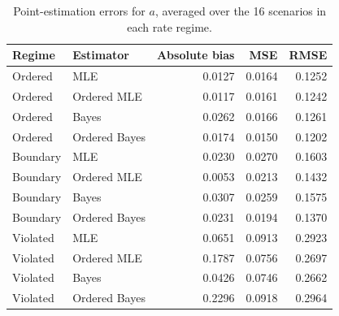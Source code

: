 \begin{table}[htbp]
\centering
\caption{Point-estimation errors for $a$, averaged over the 16 scenarios in each rate regime.}\label{tab:strength_rate}
\small
\begin{tabular}{llrrr}
\toprule
Regime & Estimator & Absolute bias & MSE & RMSE \\
\midrule
Ordered & MLE & 0.0127 & 0.0164 & 0.1252 \\
Ordered & Ordered MLE & 0.0117 & 0.0161 & 0.1242 \\
Ordered & Bayes & 0.0262 & 0.0166 & 0.1261 \\
Ordered & Ordered Bayes & 0.0174 & 0.0150 & 0.1202 \\
Boundary & MLE & 0.0230 & 0.0270 & 0.1603 \\
Boundary & Ordered MLE & 0.0053 & 0.0213 & 0.1432 \\
Boundary & Bayes & 0.0307 & 0.0259 & 0.1575 \\
Boundary & Ordered Bayes & 0.0231 & 0.0194 & 0.1370 \\
Violated & MLE & 0.0651 & 0.0913 & 0.2923 \\
Violated & Ordered MLE & 0.1787 & 0.0756 & 0.2697 \\
Violated & Bayes & 0.0426 & 0.0746 & 0.2662 \\
Violated & Ordered Bayes & 0.2296 & 0.0918 & 0.2964 \\
\bottomrule
\end{tabular}
\end{table}

